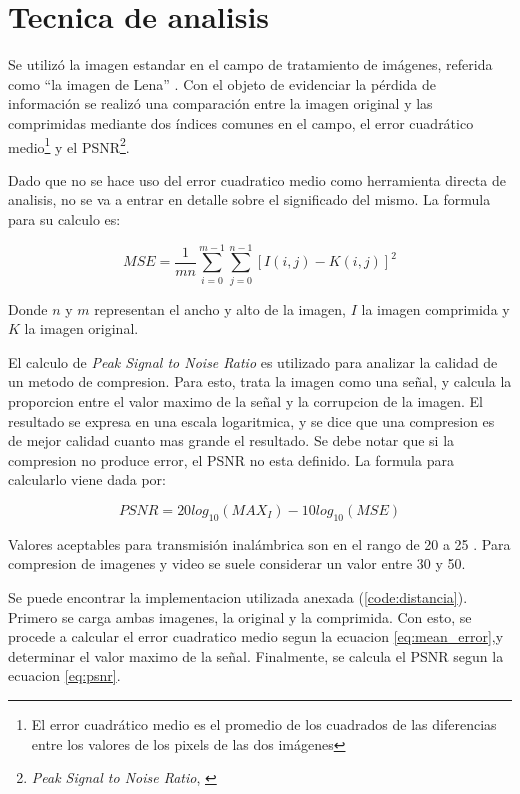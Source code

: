 \documentclass[twocolumn,a4paper,10pt]{article}
\begin{document}
\section{Tecnica de analisis}
\label{sec:tecnica}

Se utiliz\'o la imagen estandar en el campo de tratamiento de im\'agenes, referida como ``la imagen de Lena'' \cite{lena} \cite{lenaweb}.
Con el objeto de evidenciar la pérdida de información se realizó una comparación entre la imagen original y las comprimidas mediante dos índices comunes en el campo, el error cuadrático medio\footnote{El error cuadrático medio es el promedio de los cuadrados de las diferencias entre los valores de los pixels de las dos imágenes} y el PSNR\footnote{\textit{Peak Signal to Noise Ratio}, \cite{PSNR}}.  

Dado que no se hace uso del error cuadratico medio como herramienta directa de analisis, no se va a entrar en detalle sobre el significado del mismo. La formula para su calculo es:

\begin{equation}
    \label{eq:mean_error}
    MSE = \frac{1}{m n} \sum_{i=0}^{m -1} \sum_{j = 0}^{n -1} [ I(i, j) - K(i, j) ]^2
\end{equation}

Donde $n$ y $m$ representan el ancho y alto de la imagen, $I$ la imagen comprimida y $K$ la imagen original.

El calculo de \textit{Peak Signal to Noise Ratio} es utilizado para analizar la calidad de un metodo de compresion.
Para esto, trata la imagen como una señal, y calcula la proporcion entre el valor maximo de la señal y la corrupcion de la imagen.
El resultado se expresa en una escala logaritmica, y se dice que una compresion es de mejor calidad cuanto mas grande el resultado.
Se debe notar que si la compresion no produce error, el PSNR no esta definido.
La formula para calcularlo viene dada por:

\begin{equation}
    \label{eq:psnr}
    PSNR = 20 log_{10}(MAX_I) - 10 log_{10}(MSE)
\end{equation}

Valores aceptables para transmisión inalámbrica son en el rango de 20 a 25 \cite{Wikipedia_PSNR}.
Para compresion de imagenes y video se suele considerar un valor entre 30 y 50.

Se puede encontrar la implementacion utilizada anexada (\ref{code:distancia}).
Primero se carga ambas imagenes, la original y la comprimida.
Con esto, se procede a calcular el error cuadratico medio segun la ecuacion \ref{eq:mean_error},y determinar el valor maximo de la señal.
Finalmente, se calcula el PSNR segun la ecuacion \ref{eq:psnr}.
\end{document}
